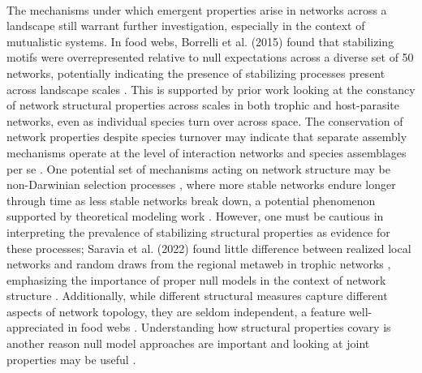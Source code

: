 \paragraph*{} %
The mechanisms under which emergent properties arise in networks across a landscape still warrant further investigation, especially in the context of mutualistic systems. In food webs, Borrelli et al. (2015) found that stabilizing motifs were overrepresented relative to null expectations across a diverse set of 50 networks, potentially indicating the presence of stabilizing processes present across landscape scales \parencite{borrelli2015selection}. This is supported by prior work looking at the constancy of network structural properties across scales in both trophic \parencite{fahimipour2014dynamics} and host-parasite \parencite{dallas2018compositional} networks, even as individual species turn over across space. The conservation of network properties despite species turnover may indicate that separate assembly mechanisms operate at the level of interaction networks and species assemblages per se \parencite{petanidou2008long, dupont2009spatio, burkle2011future, dehling2020similar, ten2024latitudinal}. One potential set of mechanisms acting on network structure may be non-Darwinian selection processes \parencite{saravia2022ecological}, where more stable networks endure longer through time as less stable networks break down, a potential phenomenon supported by theoretical modeling work \parencite{cai2020mutualistic}. However, one must be cautious in interpreting the prevalence of stabilizing structural properties as evidence for these processes; Saravia et al. (2022) found little difference between realized local networks and random draws from the regional metaweb in trophic networks \parencite{saravia2022ecological}, emphasizing the importance of proper null models in the context of network structure \parencite{maynard2018network, pellissier2018comparing}. Additionally, while different structural measures capture different aspects of network topology, they are seldom independent, a feature well-appreciated in food webs \parencite{vermaat2009major}. Understanding how structural properties covary is another reason null model approaches are important and looking at joint properties may be useful \parencite{fortuna2010nestedness, poisot2014ecological, pellissier2018comparing, dormann2017}. 






